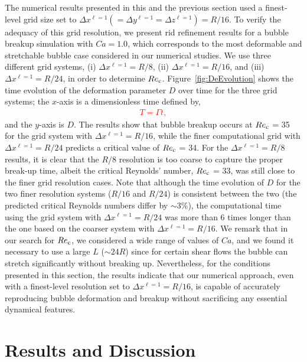 \documentclass{elsarticle}
\begin{document}
The numerical results presented in this and the previous section used a finest-level grid size set to $\Delta x^{\ell=1}(= \Delta y^{\ell=1}= \Delta z^{\ell=1})=R/16$. To verify the adequacy of this grid resolution, we present rid refinement results for a bubble breakup simulation with $Ca=1.0$, which corresponds to the most deformable and stretchable bubble case considered in our numerical studies. We use three different grid systems, (i) $\Delta x^{\ell=1}=R/8$, (ii) $\Delta x^{\ell=1}=R/16$, and (iii) $\Delta x^{\ell=1}=R/24$, in order to determine $Re_{\rm c}$.  Figure~\ref{fig:DeEvolution} shows the time evolution of the deformation parameter $D$ over time for the three grid systems; the $x$-axis is a dimensionless time defined by,
\textcolor{red}{
\begin{eqnarray}
T=\Gamma t,
\end{eqnarray}
}
and the $y$-axis is $D$.  The results show that bubble breakup occurs at $Re_{\rm c}$ = 35 for the grid system with $\Delta x^{\ell=1}=R/16$, while the finer computational grid with $\Delta x^{\ell=1}=R/24$ predicts a critical value of $Re_{\rm c}$ = 34.  For the $\Delta x^{\ell=1}=R/8$ results, it is clear that the $R/8$ resolution is too coarse to capture the proper break-up time, albeit the critical Reynolds' number, $Re_{\rm c}$ = 33, was still close to the finer grid resolution cases.  Note that although the time evolution of $D$ for the two finer resolution systems ($R/16$ and $R/24$) is consistent between the two (the predicted critical Reynolds numbers differ by $\sim 3\%$), the computational time using the grid system with $\Delta x^{\ell=1}=R/24$ was more than 6 times longer than the one based on the coarser system with $\Delta x^{\ell=1}=R/16$.  We remark that in our search for $Re_{\rm c}$, we considered a wide range of values of $Ca$, and we found it necessary to use a large $L$ ($\sim 24R$) since for certain shear flows the bubble can stretch significantly without breaking up.  Nevertheless, for the conditions presented in this section, the results indicate that our numerical approach, even with a finest-level resolution set to $\Delta x^{\ell=1}=R/16$, is capable of accurately reproducing bubble deformation and breakup without sacrificing any essential dynamical features.

\section{Results and Discussion}
\end{document}
